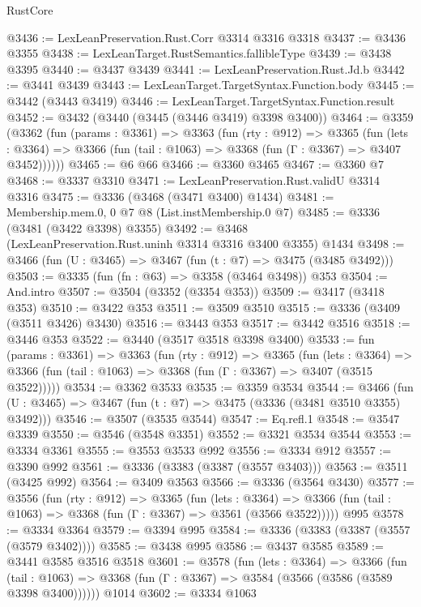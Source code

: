 \begin{lexlean}{RustCore}
\begin{coremodule}
@3436 := LexLeanPreservation.Rust.Corr @3314 @3316 @3318
@3437 := @3436 @3355
@3438 := LexLeanTarget.RustSemantics.fallibleType
@3439 := @3438 @3395
@3440 := @3437 @3439
@3441 := LexLeanPreservation.Rust.Jd.b
@3442 := @3441 @3439
@3443 := LexLeanTarget.TargetSyntax.Function.body
@3445 := @3442 (@3443 @3419)
@3446 := LexLeanTarget.TargetSyntax.Function.result
@3452 := @3432 (@3440 (@3445 (@3446 @3419) @3398 @3400))
@3464 := @3359
    (@3362
      (fun (params : @3361) =>
      @3363
        (fun (rty : @912) =>
        @3365
          (fun (lets : @3364) =>
          @3366 (fun (tail : @1063) => @3368 (fun (Γ : @3367) => @3407 @3452))))))
@3465 := @6 @66
@3466 := @3360 @3465
@3467 := @3360 @7
@3468 := @3337 @3310
@3471 := LexLeanPreservation.Rust.validU @3314 @3316
@3475 := @3336 (@3468 (@3471 @3400) @1434)
@3481 := Membership.mem.{0, 0} @7 @8 (List.instMembership.{0} @7)
@3485 := @3336 (@3481 (@3422 @3398) @3355)
@3492 := @3468 (LexLeanPreservation.Rust.uninh @3314 @3316 @3400 @3355) @1434
@3498 := @3466 (fun (U : @3465) => @3467 (fun (t : @7) => @3475 (@3485 @3492)))
@3503 := @3335 (fun (fn : @63) => @3358 (@3464 @3498)) @353
@3504 := And.intro
@3507 := @3504 (@3352 (@3354 @353))
@3509 := @3417 (@3418 @353)
@3510 := @3422 @353
@3511 := @3509 @3510
@3515 := @3336 (@3409 (@3511 @3426) @3430)
@3516 := @3443 @353
@3517 := @3442 @3516
@3518 := @3446 @353
@3522 := @3440 (@3517 @3518 @3398 @3400)
@3533 := fun (params : @3361) =>
  @3363
    (fun (rty : @912) =>
    @3365
      (fun (lets : @3364) =>
      @3366 (fun (tail : @1063) => @3368 (fun (Γ : @3367) => @3407 (@3515 @3522)))))
@3534 := @3362 @3533
@3535 := @3359 @3534
@3544 := @3466 (fun (U : @3465) => @3467 (fun (t : @7) => @3475 (@3336 (@3481 @3510 @3355) @3492)))
@3546 := @3507 (@3535 @3544)
@3547 := Eq.refl.{1}
@3548 := @3547 @3339
@3550 := @3546 (@3548 @3351)
@3552 := @3321 @3534 @3544
@3553 := @3334 @3361
@3555 := @3553 @3533 @992
@3556 := @3334 @912
@3557 := @3390 @992
@3561 := @3336 (@3383 (@3387 (@3557 @3403)))
@3563 := @3511 (@3425 @992)
@3564 := @3409 @3563
@3566 := @3336 (@3564 @3430)
@3577 := @3556
    (fun (rty : @912) =>
    @3365
      (fun (lets : @3364) =>
      @3366 (fun (tail : @1063) => @3368 (fun (Γ : @3367) => @3561 (@3566 @3522)))))
    @995
@3578 := @3334 @3364
@3579 := @3394 @995
@3584 := @3336 (@3383 (@3387 (@3557 (@3579 @3402))))
@3585 := @3438 @995
@3586 := @3437 @3585
@3589 := @3441 @3585 @3516 @3518
@3601 := @3578
    (fun (lets : @3364) =>
    @3366
      (fun (tail : @1063) => @3368 (fun (Γ : @3367) => @3584 (@3566 (@3586 (@3589 @3398 @3400))))))
    @1014
@3602 := @3334 @1063

\end{coremodule}
\end{lexlean}
